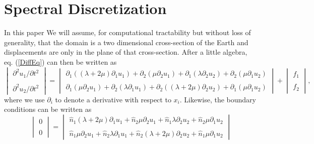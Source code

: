 \documentclass[12pt]{article}
\begin{document}
\section*{Spectral Discretization}
In this paper We will assume, for computational tractability but
without loss of generality, that the domain is a two dimensional
cross-section of the Earth and displacements are only in the plane of
that cross-section.  After a little algebra, eq. (\ref{DiffEq}) can then be
written as
\begin{equation}
\begin{vmatrix}
  \partial^2 u_1/\partial t^2\\ \\
  \partial^2 u_2/\partial t^2
\end{vmatrix} =
\begin{vmatrix}
 \partial_1\left((\lambda + 2\mu)\partial_1 u_1\right) +  
 \partial_2\left(\mu\partial_2 u_1\right) + 
 \partial_1\left(\lambda\partial_2 u_2\right) +  
 \partial_2\left(\mu\partial_1 u_2\right)\\ \\
 \partial_1\left(\mu\partial_2 u_1\right) +  
 \partial_2\left(\lambda\partial_1 u_1\right) + 
 \partial_2\left((\lambda + 2\mu)\partial_2 u_2\right) +  
 \partial_1\left(\mu\partial_1 u_2\right) 
\end{vmatrix} + 
\begin{vmatrix}
  f_1\\ \\
  f_2
\end{vmatrix},
\end{equation}
where we use $\partial_i$ to denote a derivative with respect to
$x_i$.  Likewise, the boundary conditions can be written as
\begin{equation}
\begin{vmatrix}
  0\\ \\
  0
\end{vmatrix} =
\begin{vmatrix}
 \hat{n}_1(\lambda + 2\mu)\partial_1 u_1 +  
 \hat{n}_2\mu\partial_2 u_1 + 
 \hat{n}_1\lambda\partial_2 u_2 +  
 \hat{n}_2\mu\partial_1 u_2\\ \\
 \hat{n}_1\mu\partial_2 u_1 +  
 \hat{n}_2\lambda\partial_1 u_1 + 
 \hat{n}_2(\lambda + 2\mu)\partial_2 u_2 +  
 \hat{n}_1\mu\partial_1 u_2
\end{vmatrix} 
\end{equation}
\end{document}
